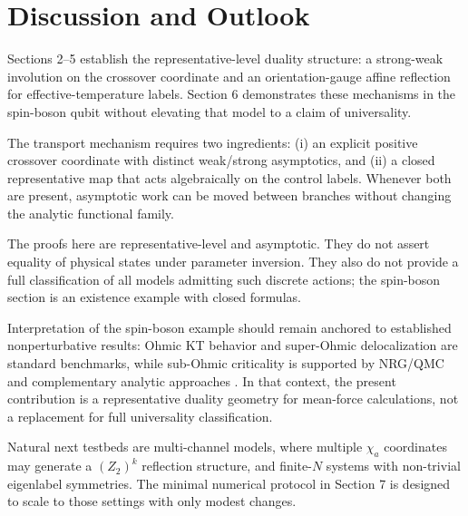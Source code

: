 \section{Discussion and Outlook}
\label{sec:discussion_outlook}

Sections 2--5 establish the representative-level duality structure: a strong-weak involution on
the crossover coordinate and an orientation-gauge affine reflection for effective-temperature labels.
Section 6 demonstrates these mechanisms in the spin-boson qubit without elevating that model to a
claim of universality.

The transport mechanism requires two ingredients: (i) an explicit positive crossover coordinate with
distinct weak/strong asymptotics, and (ii) a closed representative map that acts algebraically on
the control labels. Whenever both are present, asymptotic work can be moved between branches without
changing the analytic functional family.

The proofs here are representative-level and asymptotic. They do not assert equality of physical
states under parameter inversion. They also do not provide a full classification of all models
admitting such discrete actions; the spin-boson section is an existence example with closed formulas.

Interpretation of the spin-boson example should remain anchored to established nonperturbative
results: Ohmic KT behavior and super-Ohmic delocalization are standard benchmarks, while sub-Ohmic
criticality is supported by NRG/QMC and complementary analytic approaches
\cite{leggettDynamicsDissipativeTwostate1987,weissQuantumDissipativeSystems2012,bullaQuantumPhaseTransitionSubohmic2003,vojtaQuantumPhaseTransitionsSubohmic2005,winterQuantumPhaseTransitionSubohmic2009,bullaNumericalRenormalizationGroup2008,chinGeneralizedPolaronAnsatz2011}.
In that context, the present contribution is a representative duality geometry for mean-force
calculations, not a replacement for full universality classification.

Natural next testbeds are multi-channel models, where multiple \(\chi_a\) coordinates may generate a
\((Z_2)^k\) reflection structure, and finite-\(N\) systems with non-trivial eigenlabel symmetries.
The minimal numerical protocol in Section 7 is designed to scale to those settings with only modest
changes.
